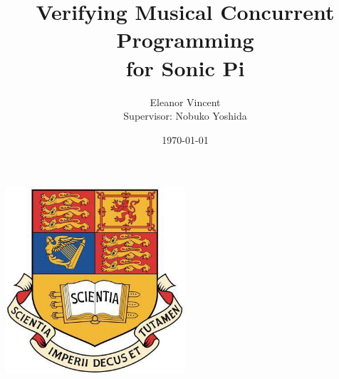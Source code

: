 \documentclass[11pt, abstracton, twoside, titlepage=true]{scrartcl}
\begin{document}
\subject{{\large Department of Computing \\ Imperial College London} \\
\LARGE{Individual MEng Project}}
\title{Verifying Musical Concurrent Programming \\ for Sonic Pi}
\author{{\LARGE Eleanor Vincent} \\ {\large Supervisor: Nobuko Yoshida}}
\date{\today} 

\maketitle{\thispagestyle{empty}}

\begin{center} 
	\includegraphics[width=0.50\textwidth]{images/crest.jpg}
\end{center}

\afterpage{\thispagestyle{empty}\null\newpage}
\newpage
\end{document}
